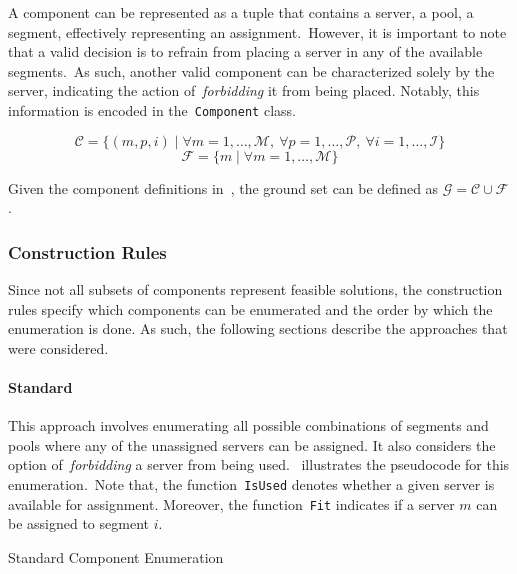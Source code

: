 A component can be represented as a tuple that contains a server, a pool, a
segment, effectively representing an assignment.~However, it is important to
note that a valid decision is to refrain from placing a server in any of the
available segments.~As such, another valid component can be characterized solely
by the server, indicating the action of~\emph{forbidding} it from being placed.
Notably, this information is encoded in the~\texttt{Component} class.

\begin{equation}
  \label{eq:odc-components-1}
  \mathcal{C} = \{(m, p, i) \mid \forall m = 1, \ldots, \mathcal{M},\ \forall p = 1, \ldots, \mathcal{P},\ \forall i = 1, \ldots, \mathcal{I}\}
\end{equation}
\begin{equation}
  \label{eq:odc-components-2}
  \mathcal{F} = \{m \mid \forall m = 1, \ldots, \mathcal{M}\}
\end{equation}

Given the component definitions
in~, the ground set can be defined
as $\mathcal{G} = \mathcal{C} \cup \mathcal{F}$.

\subsubsection*{Construction Rules}

Since not all subsets of components represent feasible solutions, the
construction rules specify which components can be enumerated and the order by
which the enumeration is done. As such, the following sections describe the
approaches that were considered.

\paragraph*{Standard}

This approach involves enumerating all possible combinations of segments and
pools where any of the unassigned servers can be assigned. It also considers the
option of~\emph{forbidding} a server from being
used.~ illustrates the pseudocode for this
enumeration.~Note that, the function~\texttt{IsUsed} denotes whether a given
server is available for assignment. Moreover, the function~\texttt{Fit}
indicates if a server $m$ can be assigned to segment $i$.

\begin{algorithm}[h]
  
  \caption{Standard Component Enumeration}
  \label{algorithm:odc-enum-standard}
\end{algorithm}


